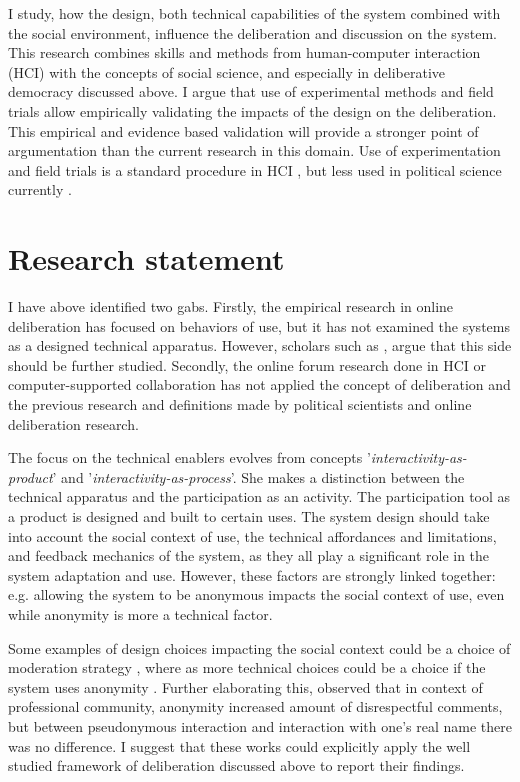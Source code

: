 \documentclass{article}
\begin{document}
I study, how the design, both technical capabilities of the system combined with the social environment, influence the deliberation and discussion on the system. This research combines skills and methods from human-computer interaction (HCI) with the concepts of social science, and especially in deliberative democracy discussed above. I argue that use of experimental methods and field trials allow empirically validating the impacts of the design on the deliberation. This empirical and evidence based validation will provide a stronger point of argumentation than the current research in this domain. Use of experimentation and field trials is a standard procedure in HCI , but less used in political science currently .


\section{Research statement}

I have above identified two gabs. Firstly, the empirical research in online deliberation has focused on behaviors of use, but it has not examined the systems as a designed technical apparatus. However, scholars such as , argue that this side should be further studied. Secondly, the online forum research done in HCI or computer-supported collaboration has not applied the concept of deliberation and the previous research and definitions made by political scientists and online deliberation research. 

The focus on the technical enablers evolves from  concepts '\textit{interactivity-as-product}' and '\textit{interactivity-as-process}'. She makes a distinction between the technical apparatus and the participation as an activity. The participation tool as a product is designed and built to certain uses. The system design should take into account the social context of use, the technical affordances and limitations, and feedback mechanics of the system, as they all play a significant role in the system adaptation and use. However, these factors are strongly linked together: e.g. allowing the system to be anonymous impacts the social context of use, even while anonymity is more a technical factor.

Some examples of design choices impacting the social context could be a choice of moderation strategy \cite{wright07}, where as more technical choices could be a choice if the system uses anonymity \cite{kilner05}. Further elaborating this,  observed that in context of professional community, anonymity increased amount of disrespectful comments, but between pseudonymous interaction and interaction with one's real name there was no difference. I suggest that these works could explicitly apply the well studied framework of deliberation discussed above to report their findings.
\end{document}
